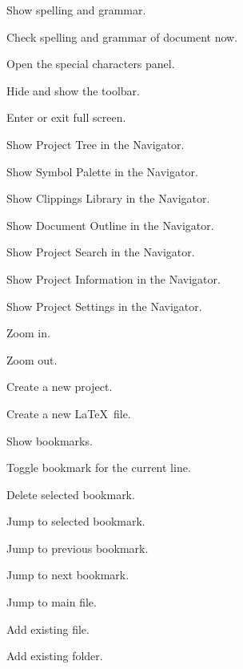 \begin{description}
	\item[\keys{\cmdkey + {:}}] Show spelling and grammar.
	\item[\keys{\cmdkey + {;}}] Check spelling and grammar of document now.
	\item[] Open the special characters panel.
	\item[] Hide and show the toolbar.
	\item[] Enter or exit full screen.
	\item[] Show Project Tree in the Navigator.
	\item[] Show Symbol Palette in the Navigator.
	\item[] Show Clippings Library in the Navigator.
	\item[] Show Document Outline in the Navigator.
	\item[] Show Project Search in the Navigator.
	\item[] Show Project Information in the Navigator.
	\item[] Show Project Settings in the Navigator.
	\item[\keys{\cmdkey + \ensuremath{+}}] Zoom in.
	\item[\keys{\cmdkey + \ensuremath{-}}] Zoom out.
	\item[] Create a new project.
	\item[] Create a new \LaTeX\ file.
	\item[] Show bookmarks.
	\item[] Toggle bookmark for the current line.
	\item[\keys{\cmdkey + \delkey}] Delete selected bookmark.
	\item[] Jump to selected bookmark.
	\item[] Jump to previous bookmark.
	\item[] Jump to next bookmark.
	\item[] Jump to main file.
	\item[] Add existing file.
	\item[] Add existing folder.

\end{description}
